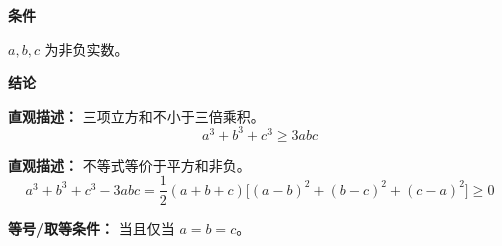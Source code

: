 \begin{statementbox}

\textbf{\textcolor{CStatement}{条件}}
\begin{description}[style=nextline, leftmargin=2.8em, labelsep=0.5em, itemsep=0.35em]
    \item[\textbf{\textcolor{CStatement}{条件 1（变量范围）：}}] $a, b, c$ 为非负实数。
\end{description}

\textbf{\textcolor{CStatement}{结论}}
\begin{description}[style=nextline, leftmargin=2.8em, labelsep=0.5em, itemsep=0.45em]
    \item[\textbf{\textcolor{CStatement}{结论一（立方和不等式）：}}]
    \textbf{\textcolor{CStatement}{直观描述：}} 三项立方和不小于三倍乘积。
    \[
    a^3 + b^3 + c^3 \geq 3abc
    \]

    \item[\textbf{\textcolor{CStatement}{推广结论（因式分解）：}}]
    \textbf{\textcolor{CStatement}{直观描述：}} 不等式等价于平方和非负。
    \[
    a^3 + b^3 + c^3 - 3abc = \frac{1}{2}(a+b+c)\bigl[(a-b)^2+(b-c)^2+(c-a)^2\bigr] \geq 0
    \]
\end{description}

\textbf{\textcolor{CStatement}{等号/取等条件：}} 当且仅当 $a = b = c$。

\end{statementbox}
